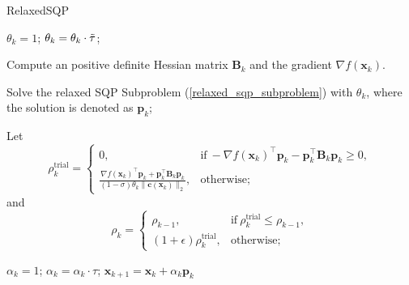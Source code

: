 \documentclass[aos]{imsart}
\numberwithin{equation}{section}
\theoremstyle{plain}
\begin{document}
\begin{algorithm}[h]
 \caption{RelaxedSQP
         }
 \label{alg_det_relaxed_sqp}
 \begin{algorithmic}[1]
 \renewcommand{\algorithmicrequire}{\textbf{Input:} $\bm{\ell} \leq \bm{x}_0 \leq \bm{u}$, $\tau, \Tilde{\tau} \in (0,1)$, $\sigma \in (0,1)$, $\rho_{-1} >0$, $\epsilon>0$, $\beta \in (0,1)$.}
 \REQUIRE 
  \STATE $\theta_k = 1$;
  \STATE $\theta_k = \theta_k \cdot \Tilde{\tau}$;

  \ENDWHILE

  \STATE Compute an positive definite Hessian matrix $\bm{B}_k$ and the gradient $\nabla f(\bm{x}_k)$.
  
  \STATE Solve the relaxed SQP Subproblem (\ref{relaxed_sqp_subproblem}) with $\theta_k$, where the solution is denoted as $\bm{p}_k$;

  \STATE Let \begin{equation}
  \label{det_rho_trial}
        \rho_k^{\text{trial}} = \left \{ \begin{array}{cc}
           0,  & \text{if}~ -\nabla f(\bm{x}_k)^{\top} \bm{p}_k - \bm{p}_k^{\top} \bm{B}_k \bm{p}_k \geq 0, \\
           \frac{\nabla f(\bm{x}_k)^{\top} \bm{p}_k + \bm{p}_k^{\top} \bm{B}_k \bm{p}_k}{(1-\sigma)\theta_k \|\bm{c}(\bm{x}_k)\|_2},  &  \text{otherwise;}
        \end{array}\right.
\end{equation}
and
\begin{equation}
\label{det_rho}
    \rho_k = \left\{ \begin{array}{cc}
        \rho_{k-1}, &  \text{if}~\rho_{k}^{\text{trial}} \leq \rho_{k-1}, \\
        (1+\epsilon)\rho_{k}^{\text{trial}}, & \text{otherwise};
    \end{array} \right.
\end{equation}

  \STATE $\alpha_k = 1$;
  \STATE $\alpha_k = \alpha_k \cdot \tau$;
  \ENDWHILE
  \STATE $\bm{x}_{k+1} = \bm{x}_{k} + \alpha_k \bm{p}_{k}$
  \ENDFOR
 \end{algorithmic}
 \end{algorithm}
 
\end{document}
